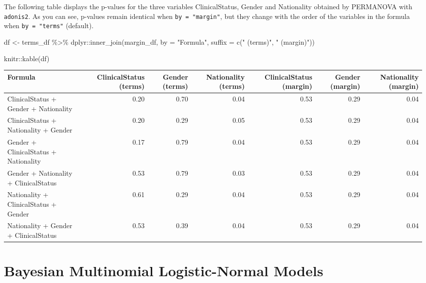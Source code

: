 \documentclass[
]{book}
\newenvironment{Shaded}{\begin{snugshade}}{\end{snugshade}}
\newcommand{\AttributeTok}[1]{\textcolor[rgb]{0.77,0.63,0.00}{#1}}
\newcommand{\FunctionTok}[1]{\textcolor[rgb]{0.00,0.00,0.00}{#1}}
\newcommand{\NormalTok}[1]{#1}
\newcommand{\OtherTok}[1]{\textcolor[rgb]{0.56,0.35,0.01}{#1}}
\newcommand{\SpecialCharTok}[1]{\textcolor[rgb]{0.00,0.00,0.00}{#1}}
\newcommand{\StringTok}[1]{\textcolor[rgb]{0.31,0.60,0.02}{#1}}
\begin{document}
The following table displays the p-values for the three variables ClinicalStatus, Gender and
Nationality obtained by PERMANOVA with \texttt{adonis2}. As you can see, p-values remain identical when
\texttt{by\ =\ "margin"}, but they change with the order of the variables in the formula when \texttt{by\ =\ "terms"} (default).

\begin{Shaded}
\begin{Highlighting}[]
\NormalTok{df }\OtherTok{\textless{}{-}}\NormalTok{ terms\_df }\SpecialCharTok{\%\textgreater{}\%}
\NormalTok{  dplyr}\SpecialCharTok{::}\FunctionTok{inner\_join}\NormalTok{(margin\_df, }\AttributeTok{by =} \StringTok{"Formula"}\NormalTok{, }\AttributeTok{suffix =} \FunctionTok{c}\NormalTok{(}\StringTok{" (terms)"}\NormalTok{, }\StringTok{" (margin)"}\NormalTok{))}

\NormalTok{knitr}\SpecialCharTok{::}\FunctionTok{kable}\NormalTok{(df)}
\end{Highlighting}
\end{Shaded}

\begin{tabular}{l|r|r|r|r|r|r}
\hline
Formula & ClinicalStatus (terms) & Gender (terms) & Nationality (terms) & ClinicalStatus (margin) & Gender (margin) & Nationality (margin)\\
\hline
ClinicalStatus + Gender + Nationality & 0.20 & 0.70 & 0.04 & 0.53 & 0.29 & 0.04\\
\hline
ClinicalStatus + Nationality + Gender & 0.20 & 0.29 & 0.05 & 0.53 & 0.29 & 0.04\\
\hline
Gender + ClinicalStatus + Nationality & 0.17 & 0.79 & 0.04 & 0.53 & 0.29 & 0.04\\
\hline
Gender + Nationality + ClinicalStatus & 0.53 & 0.79 & 0.03 & 0.53 & 0.29 & 0.04\\
\hline
Nationality + ClinicalStatus + Gender & 0.61 & 0.29 & 0.04 & 0.53 & 0.29 & 0.04\\
\hline
Nationality + Gender + ClinicalStatus & 0.53 & 0.39 & 0.04 & 0.53 & 0.29 & 0.04\\
\hline
\end{tabular}

\hypertarget{bayesian-multinomial-logistic-normal-models}{%
\section{Bayesian Multinomial Logistic-Normal Models}\label{bayesian-multinomial-logistic-normal-models}}
\end{document}
